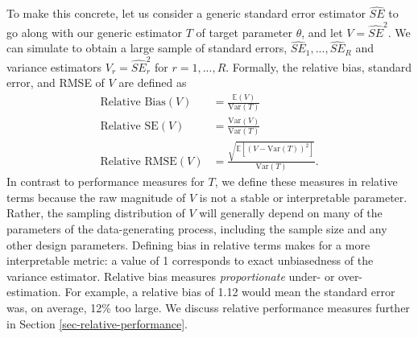 \documentclass[
]{book}
\newcommand{\E}{\mathbb{E}}
\newcommand{\Var}{\text{Var}}
\begin{document}
To make this concrete, let us consider a generic standard error estimator \(\widehat{SE}\) to go along with our generic estimator \(T\) of target parameter \(\theta\), and let \(V = \widehat{SE}^2\).
We can simulate to obtain a large sample of standard errors, \(\widehat{SE}_1,...,\widehat{SE}_R\) and variance estimators \(V_r = \widehat{SE}_r^2\) for \(r = 1,...,R\).
Formally, the relative bias, standard error, and RMSE of \(V\) are defined as
\[
\begin{aligned}
\text{Relative Bias}(V) &= \frac{\E(V)}{\Var(T)} \\
\text{Relative SE}(V) &= \frac{\Var(V)}{\Var(T)} \\
\text{Relative RMSE}(V) &= \frac{\sqrt{\E\left[\left(V - \Var(T)\right)^2 \right]}}{\Var(T)}.
\end{aligned}
\label{eq:relative-bias-SE-RMSE}
\]
In contrast to performance measures for \(T\), we define these measures in relative terms because the raw magnitude of \(V\) is not a stable or interpretable parameter.
Rather, the sampling distribution of \(V\) will generally depend on many of the parameters of the data-generating process, including the sample size and any other design parameters.
Defining bias in relative terms makes for a more interpretable metric: a value of 1 corresponds to exact unbiasedness of the variance estimator.
Relative bias measures \emph{proportionate} under- or over-estimation.
For example, a relative bias of 1.12 would mean the standard error was, on average, 12\% too large.
We discuss relative performance measures further in Section \ref{sec-relative-performance}.
\end{document}
